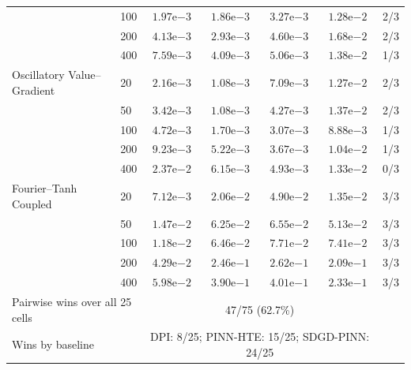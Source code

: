 \begin{table}[t]
\begin{tabular}{llccccc}
 & 100 & $1.97\mathrm{e}{-3}$ & \textbf{$1.86\mathrm{e}{-3}$} & $3.27\mathrm{e}{-3}$ & $1.28\mathrm{e}{-2}$ & 2/3 \\
 & 200 & $4.13\mathrm{e}{-3}$ & \textbf{$2.93\mathrm{e}{-3}$} & $4.60\mathrm{e}{-3}$ & $1.68\mathrm{e}{-2}$ & 2/3 \\
 & 400 & $7.59\mathrm{e}{-3}$ & \textbf{$4.09\mathrm{e}{-3}$} & $5.06\mathrm{e}{-3}$ & $1.38\mathrm{e}{-2}$ & 1/3 \\
\addlinespace[2pt]
Oscillatory Value--Gradient & 20 & $2.16\mathrm{e}{-3}$ & \textbf{$1.08\mathrm{e}{-3}$} & $7.09\mathrm{e}{-3}$ & $1.27\mathrm{e}{-2}$ & 2/3 \\
 & 50 & $3.42\mathrm{e}{-3}$ & \textbf{$1.08\mathrm{e}{-3}$} & $4.27\mathrm{e}{-3}$ & $1.37\mathrm{e}{-2}$ & 2/3 \\
 & 100 & $4.72\mathrm{e}{-3}$ & \textbf{$1.70\mathrm{e}{-3}$} & $3.07\mathrm{e}{-3}$ & $8.88\mathrm{e}{-3}$ & 1/3 \\
 & 200 & $9.23\mathrm{e}{-3}$ & $5.22\mathrm{e}{-3}$ & \textbf{$3.67\mathrm{e}{-3}$} & $1.04\mathrm{e}{-2}$ & 1/3 \\
 & 400 & $2.37\mathrm{e}{-2}$ & $6.15\mathrm{e}{-3}$ & \textbf{$4.93\mathrm{e}{-3}$} & $1.33\mathrm{e}{-2}$ & 0/3 \\
\addlinespace[2pt]
Fourier--Tanh Coupled & 20 & \textbf{$7.12\mathrm{e}{-3}$} & $2.06\mathrm{e}{-2}$ & $4.90\mathrm{e}{-2}$ & $1.35\mathrm{e}{-2}$ & 3/3 \\
 & 50 & \textbf{$1.47\mathrm{e}{-2}$} & $6.25\mathrm{e}{-2}$ & $6.55\mathrm{e}{-2}$ & $5.13\mathrm{e}{-2}$ & 3/3 \\
 & 100 & \textbf{$1.18\mathrm{e}{-2}$} & $6.46\mathrm{e}{-2}$ & $7.71\mathrm{e}{-2}$ & $7.41\mathrm{e}{-2}$ & 3/3 \\
 & 200 & \textbf{$4.29\mathrm{e}{-2}$} & $2.46\mathrm{e}{-1}$ & $2.62\mathrm{e}{-1}$ & $2.09\mathrm{e}{-1}$ & 3/3 \\
 & 400 & \textbf{$5.98\mathrm{e}{-2}$} & $3.90\mathrm{e}{-1}$ & $4.01\mathrm{e}{-1}$ & $2.33\mathrm{e}{-1}$ & 3/3 \\
\midrule
\multicolumn{2}{l}{Pairwise wins over all 25 cells} & \multicolumn{4}{c}{47/75 (62.7\%)} & \\
\multicolumn{2}{l}{Wins by baseline} & \multicolumn{4}{c}{DPI: 8/25; PINN-HTE: 15/25; SDGD-PINN: 24/25} & \\
\bottomrule
\end{tabular}
\end{table}
